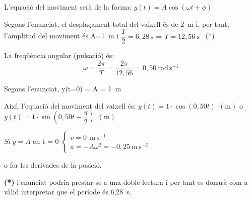 \begin{solapartat}
 L'equació del moviment serà de la forma: $y(t) = A\cos(\omega t + \phi)$

 Segons l'enunciat, el desplaçament total del vaixell és de 2~m i, per tant, l'amplitud del moviment és A=1~m i $\dfrac{T}{2} = 6,28\ \mathrm{s} \Rightarrow T = 12,56\ \mathrm{s}$ \ (*)

 La freqüència angular (pulsació) és:
\[ \omega = \frac{2\pi}{T} = \frac{2\pi}{12,56} = 0,50\ \mathrm{rad\,s^{-1}} \]

 Segons l'enunciat, y(t=0) = A = 1~m

 Així, l'equació del moviment del vaixell és: $y(t) = 1\cdot\cos(0,50t)\ \ (\mathrm{m})$ o $y(t) = 1\cdot\sin\left(0,50t + \dfrac{\pi}{2}\right)\ \ (\mathrm{m})$
\end{solapartat}

\begin{solapartat}

$\mathit{Si}\ y = A$ en t = 0 $\left\{\begin{array}{l} v = 0\ \ \mathrm{m\,s^{-1}} \\ a = -A\omega^2 = -0,25\ \mathrm{m\,s^{-2}} \end{array}\right.$

o fer les derivades de la posició.

\textbf{(*)} l'enunciat podria prestar-se a una doble lectura i per tant es donarà com a vàlid interpretar que el període és 6,28~s.
\end{solapartat}
